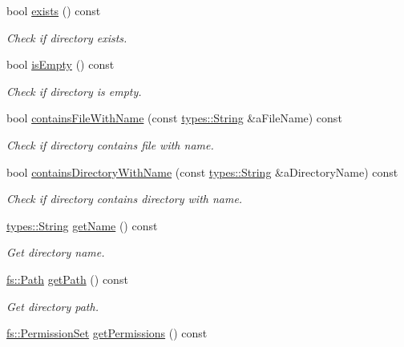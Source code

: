 \begin{DoxyCompactItemize}
bool \hyperlink{classlibrary_1_1core_1_1fs_1_1Directory_a1625670c9b94125ee6965ba8bce848fd}{exists} () const
\begin{DoxyCompactList}\small\item\em Check if directory exists. \end{DoxyCompactList}\item 
bool \hyperlink{classlibrary_1_1core_1_1fs_1_1Directory_af664c462ccd42a31c670c0304597c74a}{is\+Empty} () const
\begin{DoxyCompactList}\small\item\em Check if directory is empty. \end{DoxyCompactList}\item 
bool \hyperlink{classlibrary_1_1core_1_1fs_1_1Directory_a0d326fef28dfbb21702a12af9701ed50}{contains\+File\+With\+Name} (const \hyperlink{classlibrary_1_1core_1_1types_1_1String}{types\+::\+String} \&a\+File\+Name) const
\begin{DoxyCompactList}\small\item\em Check if directory contains file with name. \end{DoxyCompactList}\item 
bool \hyperlink{classlibrary_1_1core_1_1fs_1_1Directory_abf702bc8f107d3e4eefe15579861b8e3}{contains\+Directory\+With\+Name} (const \hyperlink{classlibrary_1_1core_1_1types_1_1String}{types\+::\+String} \&a\+Directory\+Name) const
\begin{DoxyCompactList}\small\item\em Check if directory contains directory with name. \end{DoxyCompactList}\item 
\hyperlink{classlibrary_1_1core_1_1types_1_1String}{types\+::\+String} \hyperlink{classlibrary_1_1core_1_1fs_1_1Directory_acc2dd0ae02ee3733bf20f93ac1d05a56}{get\+Name} () const
\begin{DoxyCompactList}\small\item\em Get directory name. \end{DoxyCompactList}\item 
\hyperlink{classlibrary_1_1core_1_1fs_1_1Path}{fs\+::\+Path} \hyperlink{classlibrary_1_1core_1_1fs_1_1Directory_a94b153cbebbcc5ac6db64ec3aee63901}{get\+Path} () const
\begin{DoxyCompactList}\small\item\em Get directory path. \end{DoxyCompactList}\item 
\hyperlink{classlibrary_1_1core_1_1fs_1_1PermissionSet}{fs\+::\+Permission\+Set} \hyperlink{classlibrary_1_1core_1_1fs_1_1Directory_a2214a988c6a3d2b168768d83dfa17225}{get\+Permissions} () const

\end{DoxyCompactItemize}
